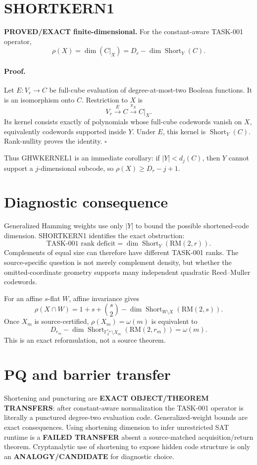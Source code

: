 \documentclass[11pt]{article}
\begin{document}
\section*{SHORTKERN1}
\textbf{PROVED/EXACT finite-dimensional.}
For the constant-aware TASK-001 operator,
\[
\boxed{\rho(X)=\dim(C|_X)=D_r-\dim\operatorname{Short}_Y(C).}
\]

\paragraph{Proof.}
Let \(E:V_r\to C\) be full-cube evaluation of degree-at-most-two Boolean functions. It is an isomorphism onto \(C\). Restriction to \(X\) is
\[
V_r\xrightarrow{E}C\xrightarrow{\pi_X}C|_X.
\]
Its kernel consists exactly of polynomials whose full-cube codewords vanish on \(X\), equivalently codewords supported inside \(Y\). Under \(E\), this kernel is \(\operatorname{Short}_Y(C)\). Rank-nullity proves the identity. \(\square\)

Thus GHWKERNEL1 is an immediate corollary: if \(|Y|<d_j(C)\), then \(Y\) cannot support a \(j\)-dimensional subcode, so \(\rho(X)\ge D_r-j+1\).

\section*{Diagnostic consequence}
Generalized Hamming weights use only \(|Y|\) to bound the possible shortened-code dimension. SHORTKERN1 identifies the exact obstruction:
\[
\boxed{\text{TASK-001 rank deficit}=\dim\operatorname{Short}_Y(\mathrm{RM}(2,r)).}
\]
Complements of equal size can therefore have different TASK-001 ranks. The source-specific question is not merely complement density, but whether the omitted-coordinate geometry supports many independent quadratic Reed--Muller codewords.

For an affine \(s\)-flat \(W\), affine invariance gives
\[
\rho(X\cap W)=1+s+\binom s2-\dim\operatorname{Short}_{W\setminus X}(\mathrm{RM}(2,s)).
\]
Once \(X_m\) is source-certified, \(\rho(X_m)=\omega(m)\) is equivalent to
\[
D_{r_m}-\dim\operatorname{Short}_{\mathbb F_2^{r_m}\setminus X_m}(\mathrm{RM}(2,r_m))=\omega(m).
\]
This is an exact reformulation, not a source theorem.

\section*{PQ and barrier transfer}
Shortening and puncturing are \textbf{EXACT OBJECT/THEOREM TRANSFERS}: after constant-aware normalization the TASK-001 operator is literally a punctured degree-two evaluation code. Generalized-weight bounds are exact consequences. Using shortening dimension to infer unrestricted SAT runtime is a \textbf{FAILED TRANSFER} absent a source-matched acquisition/return theorem. Cryptanalytic use of shortening to expose hidden code structure is only an \textbf{ANALOGY/CANDIDATE} for diagnostic choice.
\end{document}
